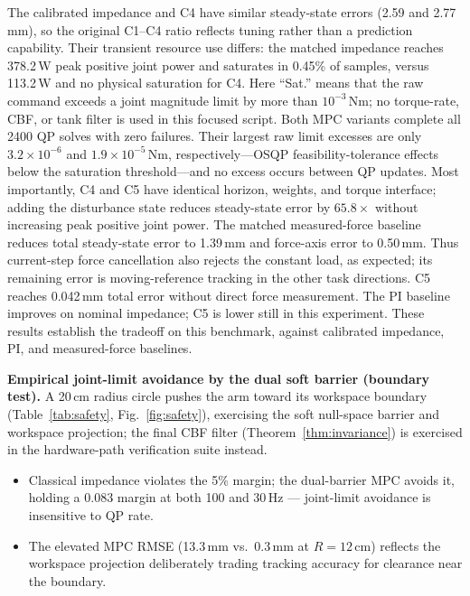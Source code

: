 \documentclass[journal]{IEEEtran}
\begin{document}
The calibrated impedance and C4 have similar steady-state errors
(2.59 and 2.77\,mm), so the original C1--C4 ratio reflects tuning rather
than a prediction capability. Their transient resource use differs: the matched
impedance reaches 378.2\,W peak positive joint power and saturates in 0.45\% of
samples, versus 113.2\,W and no physical saturation for C4. Here ``Sat.'' means
that the raw command exceeds a joint magnitude limit by more than
$10^{-3}$\,Nm; no torque-rate, CBF, or tank filter is used in this focused
script. Both MPC variants complete all 2400 QP solves with zero failures. Their
largest raw limit excesses are only $3.2\times10^{-6}$ and
$1.9\times10^{-5}$\,Nm, respectively---OSQP feasibility-tolerance effects
below the saturation threshold---and no excess occurs between QP updates.
Most importantly, C4 and C5 have
identical horizon, weights, and torque interface; adding the disturbance state
reduces steady-state error by $65.8\times$ without increasing peak positive joint power. The
matched measured-force baseline reduces total steady-state error to 1.39\,mm
and force-axis error to 0.50\,mm. Thus current-step force cancellation also
rejects the constant load, as expected; its remaining error is moving-reference
tracking in the other task directions. C5 reaches 0.042\,mm total error
without direct force measurement. The PI baseline improves on nominal
impedance; C5 is lower still in this experiment. These results establish
the tradeoff on this benchmark, against calibrated impedance, PI, and
measured-force baselines.

\textbf{Empirical joint-limit avoidance by the dual soft barrier
(boundary test).}
A 20\,cm radius circle pushes the arm toward its workspace boundary
(Table~\ref{tab:safety}, Fig.~\ref{fig:safety}), exercising the soft
null-space barrier and workspace projection; the final CBF filter
(Theorem~\ref{thm:invariance}) is exercised in the hardware-path
verification suite instead.

\begin{itemize}[leftmargin=*,itemsep=1pt,topsep=2pt]
\item Classical impedance violates the 5\% margin; the dual-barrier MPC
avoids it, holding a 0.083 margin at both 100 and 30\,Hz ---
joint-limit avoidance is insensitive to QP rate.
\item The elevated MPC RMSE (13.3\,mm vs.\ 0.3\,mm at $R=12$\,cm)
reflects the workspace projection deliberately trading tracking
accuracy for clearance near the boundary.
\end{itemize}
\end{document}
